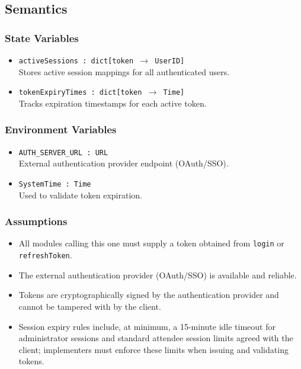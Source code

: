 \documentclass[12pt, titlepage]{article}
\begin{document}
\subsection{Semantics}

\subsubsection{State Variables}

\begin{itemize}
    \item \texttt{activeSessions : dict[token $\rightarrow$ UserID]} \\
    Stores active session mappings for all authenticated users.
    \item \texttt{tokenExpiryTimes : dict[token $\rightarrow$ Time]} \\
    Tracks expiration timestamps for each active token.
\end{itemize}

\subsubsection{Environment Variables}

\begin{itemize}
    \item \texttt{AUTH\_SERVER\_URL : URL} \\
    External authentication provider endpoint (OAuth/SSO).
    \item \texttt{SystemTime : Time} \\
    Used to validate token expiration.
\end{itemize}

\subsubsection{Assumptions}

\begin{itemize}
    \item All modules calling this one must supply a token obtained from \texttt{login} or \texttt{refreshToken}.
    \item The external authentication provider (OAuth/SSO) is available and reliable.
    \item Tokens are cryptographically signed by the authentication provider and cannot be tampered with by the client.
    \item Session expiry rules include, at minimum, a 15-minute idle timeout for administrator sessions and standard attendee session limits agreed with the client; implementers must enforce these limits when issuing and validating tokens.
\end{itemize}
\end{document}

